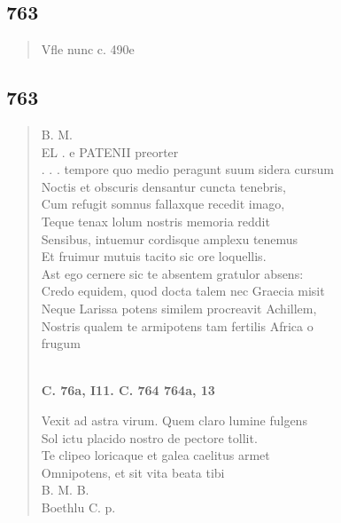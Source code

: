 \documentclass[11pt, a4paper]{report}
\begin{document}
            \subsection*{763}
      \begin{verse}
      Vfle nunc c. 490e \\ 
      \end{verse}
  
            \subsection*{763}
      \begin{verse}
      B. M. \\ EL . e PATENII preorter \\ . . . tempore quo medio peragunt suum sidera cursum \\ Noctis et obscuris densantur cuncta tenebris, \\ Cum refugit somnus fallaxque recedit imago, \\ Teque tenax lolum nostris memoria reddit \\ Sensibus, intuemur cordisque amplexu tenemus \\ Et fruimur mutuis tacito sic ore loquellis. \\ Ast ego cernere sic te absentem gratulor absens: \\ Credo equidem, quod docta talem nec Graecia misit \\ Neque Larissa potens similem procreavit Achillem, \\ Nostris qualem  \lbrack te \rbrack  armipotens tam fertilis Africa o \\ frugum \\ 
        ﻿\pagebreak 
    \begin{center} \textbf{C. 76a, I11. C. 764 764a, 13} \end{center} \marginpar{[01]} Vexit ad astra virum. Quem claro lumine fulgens \\ Sol ictu placido nostro de pectore tollit. \\ Te clipeo loricaque et galea caelitus armet \\ Omnipotens, et sit vita beata tibi \\ B. M. B. \\ Boethlu C. p. \\ 
      \end{verse}
  
\end{document}
